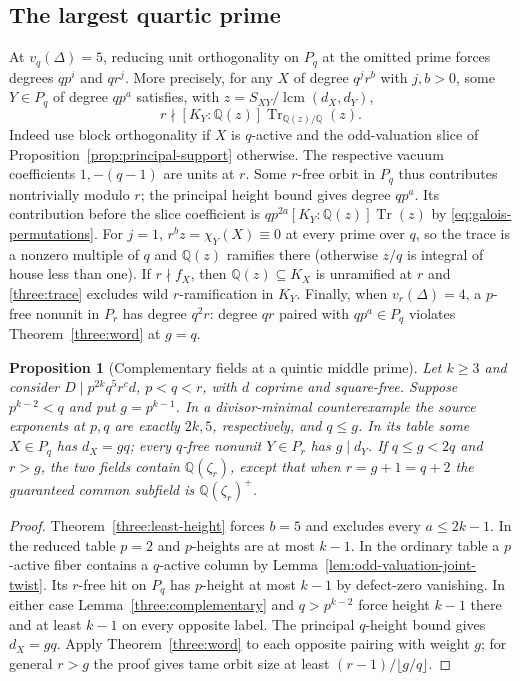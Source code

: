 \documentclass[11pt,a4paper]{article}
\numberwithin{equation}{section}
\newtheorem{proposition}[theorem]{Proposition}
\theoremstyle{remark}
\newcommand{\QQ}{\mathbb Q}
\newcommand{\Tr}{\operatorname{Tr}}
\newcommand{\lcm}{\operatorname{lcm}}
\begin{document}
\subsection{The largest quartic prime}\label{fam:M:sec:7.4}
At $v_q(\Delta)=5$, reducing unit orthogonality on $P_q$ at the omitted prime forces degrees $qp^i$ and $qr^j$. More precisely, for any $X$ of degree $q^j r^b$ with $j,b>0$, some $Y\in P_q$ of degree $qp^a$ satisfies, with $z=S_{XY}/\lcm(d_X,d_Y)$,
\begin{equation}\label{three:trace}
 r\nmid [K_Y:\QQ(z)]\Tr_{\QQ(z)/\QQ}(z).
\end{equation}
Indeed use block orthogonality if $X$ is $q$-active and the odd-valuation slice of Proposition~\ref{prop:principal-support} otherwise. The respective vacuum coefficients $1,-(q-1)$ are units at $r$. Some $r$-free orbit in $P_q$ thus contributes nontrivially modulo $r$; the principal height bound gives degree $qp^a$. Its contribution before the slice coefficient is $qp^{2a}[K_Y:\QQ(z)]\Tr(z)$ by \eqref{eq:galois-permutations}. For $j=1$, $r^b z=\chi_Y(X)\equiv0$ at every prime over $q$, so the trace is a nonzero multiple of $q$ and $\QQ(z)$ ramifies there (otherwise $z/q$ is integral of house less than one). If $r\nmid f_X$, then $\QQ(z)\subseteq K_X$ is unramified at $r$ and \eqref{three:trace} excludes wild $r$-ramification in $K_Y$. Finally, when $v_r(\Delta)=4$, a $p$-free nonunit in $P_r$ has degree $q^2r$: degree $qr$ paired with $qp^a\in P_q$ violates Theorem~\ref{three:word} at $g=q$.

\begin{proposition}[Complementary fields at a quintic middle prime]\label{fam:M:7.12}\label{three:sextic-gate}
Let $k\ge3$ and consider $D\mid p^{2k}q^5r^c d$, $p<q<r$, with $d$ coprime and square-free. Suppose $p^{k-2}<q$ and put $g=p^{k-1}$. In a divisor-minimal counterexample the source exponents at $p,q$ are exactly $2k,5$, respectively, and $q\le g$. In its table some $X\in P_q$ has $d_X=gq$; every $q$-free nonunit $Y\in P_r$ has $g\mid d_Y$. If $q\le g<2q$ and $r>g$, the two fields contain $\QQ(\zeta_r)$, except that when $r=g+1=q+2$ the guaranteed common subfield is $\QQ(\zeta_r)^+$.
\end{proposition}

\begin{proof}
Theorem~\ref{three:least-height} forces $b=5$ and excludes every $a\le2k-1$. In the reduced table $p=2$ and $p$-heights are at most $k-1$. In the ordinary table a $p$-active fiber contains a $q$-active column by Lemma~\ref{lem:odd-valuation-joint-twist}. Its $r$-free hit on $P_q$ has $p$-height at most $k-1$ by defect-zero vanishing. In either case Lemma~\ref{three:complementary} and $q>p^{k-2}$ force height $k-1$ there and at least $k-1$ on every opposite label. The principal $q$-height bound gives $d_X=gq$. Apply Theorem~\ref{three:word} to each opposite pairing with weight $g$; for general $r>g$ the proof gives tame orbit size at least $(r-1)/\lfloor g/q\rfloor$.
\end{proof}
\end{document}
